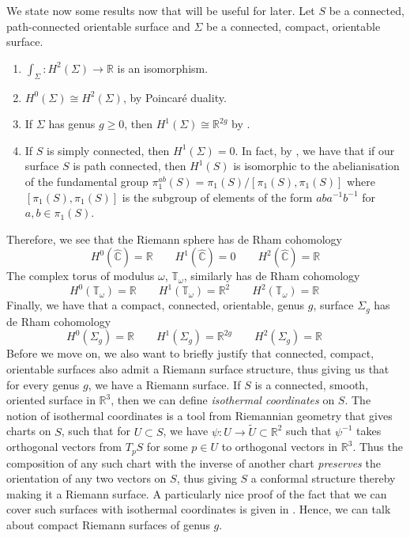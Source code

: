 \documentclass[11pt]{report}
\theoremstyle{definition}
\begin{document}
We state now some results now that will be useful for later. Let $S$ be a connected, path-connected orientable surface and $\Sigma$ be a connected, compact, orientable surface.
\begin{enumerate}
  \item $\int_{\Sigma} :H^2(\Sigma) \rightarrow \mathbb{R}$ is an isomorphism. \cite[Corollary 10.14]{calcohomo}
  \item $H^0(\Sigma)\cong H^2(\Sigma)$, by Poincar\'{e} duality.
  \item If $\Sigma$ has genus $g \geq 0$, then $H^1(\Sigma) \cong \mathbb{R}^{2g}$ by \cite[p.69]{donaldson}.
  \item If $S$ is simply connected, then $H^1(\Sigma) = 0$. In fact, by \cite[Theorem 2A.1]{Hatchers}, we have that if our surface $S$ is path connected, then $H^1(S)$ is isomorphic to the abelianisation of the fundamental group $\pi_1^{ab}(S) = \pi_1(S)/[\pi_1(S),\pi_1(S)]$ where $[\pi_1(S),\pi_1(S)]$ is the subgroup of elements of the form $aba^{-1}b^{-1}$ for $a,b \in \pi_1(S)$. 
\end{enumerate}
Therefore, we see that the Riemann sphere has de Rham cohomology
\[
  H^0(\widehat{\mathbb{C}}) = \mathbb{R} \qquad 
  H^1(\widehat{\mathbb{C}}) = 0 \qquad 
  H^2(\widehat{\mathbb{C}}) = \mathbb{R}
\]
 The complex torus of modulus $\omega$, $\mathbb{T_\omega}$, similarly has de Rham cohomology
\[
   H^0(\mathbb{T_\omega}) = \mathbb{R} \qquad
   H^1(\mathbb{T_\omega}) = \mathbb{R}^2 \qquad
   H^2(\mathbb{T_\omega}) = \mathbb{R} \qquad
\]
Finally, we have that a compact, connected, orientable, genus $g$, surface $\Sigma_g$ has de Rham cohomology
\[
   H^0(\Sigma_g) = \mathbb{R} \qquad
   H^1(\Sigma_g) = \mathbb{R}^{2g} \qquad
   H^2(\Sigma_g) = \mathbb{R} \qquad
\]
Before we move on, we also want to briefly justify that connected, compact, orientable surfaces also admit a Riemann surface structure, thus giving us that for every genus $g$, we have a Riemann surface. If $S$ is a connected, smooth, oriented surface in $\mathbb{R}^3$, then we can define \emph{isothermal coordinates} on $S$. The notion of isothermal coordinates is a tool from Riemannian geometry that gives charts on $S$, such that for $U \subset S$, we have $\psi : U \rightarrow \tilde{U} \subset \mathbb{R}^2$ such that $\psi^{-1}$ takes orthogonal vectors from $T_pS$ for some $p \in U$ to orthogonal vectors in $\mathbb{R}^3$. Thus the composition of any such chart with the inverse of another chart \emph{preserves} the orientation of any two vectors on $S$, thus giving $S$ a conformal structure thereby making it a Riemann surface. A particularly nice proof of the fact that we can cover such surfaces with isothermal coordinates is given in \cite{chern}. Hence, we can talk about compact Riemann surfaces of genus $g$. 
\end{document}
